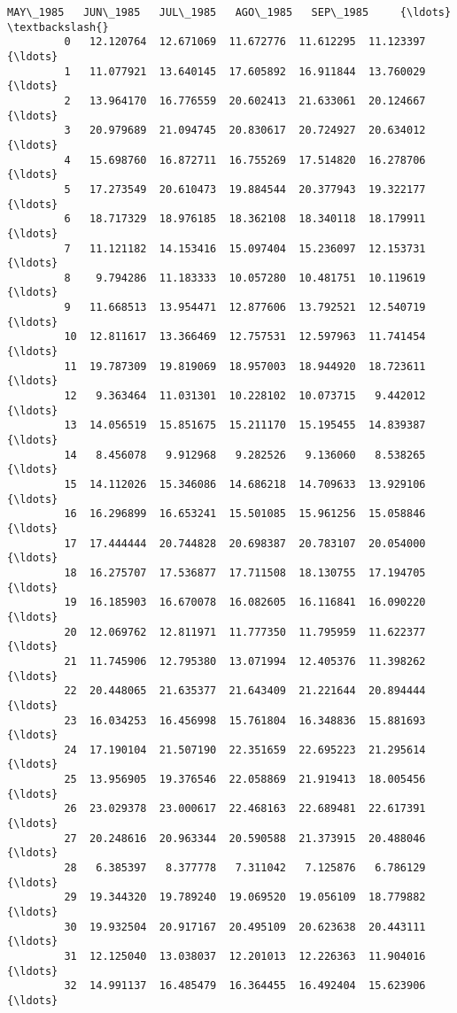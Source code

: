 \documentclass[11pt]{article}
\begin{document}
\begin{Verbatim}[commandchars=\\\{\}]
              MAY\_1985   JUN\_1985   JUL\_1985   AGO\_1985   SEP\_1985     {\ldots}      \textbackslash{}
         0   12.120764  12.671069  11.672776  11.612295  11.123397     {\ldots}       
         1   11.077921  13.640145  17.605892  16.911844  13.760029     {\ldots}       
         2   13.964170  16.776559  20.602413  21.633061  20.124667     {\ldots}       
         3   20.979689  21.094745  20.830617  20.724927  20.634012     {\ldots}       
         4   15.698760  16.872711  16.755269  17.514820  16.278706     {\ldots}       
         5   17.273549  20.610473  19.884544  20.377943  19.322177     {\ldots}       
         6   18.717329  18.976185  18.362108  18.340118  18.179911     {\ldots}       
         7   11.121182  14.153416  15.097404  15.236097  12.153731     {\ldots}       
         8    9.794286  11.183333  10.057280  10.481751  10.119619     {\ldots}       
         9   11.668513  13.954471  12.877606  13.792521  12.540719     {\ldots}       
         10  12.811617  13.366469  12.757531  12.597963  11.741454     {\ldots}       
         11  19.787309  19.819069  18.957003  18.944920  18.723611     {\ldots}       
         12   9.363464  11.031301  10.228102  10.073715   9.442012     {\ldots}       
         13  14.056519  15.851675  15.211170  15.195455  14.839387     {\ldots}       
         14   8.456078   9.912968   9.282526   9.136060   8.538265     {\ldots}       
         15  14.112026  15.346086  14.686218  14.709633  13.929106     {\ldots}       
         16  16.296899  16.653241  15.501085  15.961256  15.058846     {\ldots}       
         17  17.444444  20.744828  20.698387  20.783107  20.054000     {\ldots}       
         18  16.275707  17.536877  17.711508  18.130755  17.194705     {\ldots}       
         19  16.185903  16.670078  16.082605  16.116841  16.090220     {\ldots}       
         20  12.069762  12.811971  11.777350  11.795959  11.622377     {\ldots}       
         21  11.745906  12.795380  13.071994  12.405376  11.398262     {\ldots}       
         22  20.448065  21.635377  21.643409  21.221644  20.894444     {\ldots}       
         23  16.034253  16.456998  15.761804  16.348836  15.881693     {\ldots}       
         24  17.190104  21.507190  22.351659  22.695223  21.295614     {\ldots}       
         25  13.956905  19.376546  22.058869  21.919413  18.005456     {\ldots}       
         26  23.029378  23.000617  22.468163  22.689481  22.617391     {\ldots}       
         27  20.248616  20.963344  20.590588  21.373915  20.488046     {\ldots}       
         28   6.385397   8.377778   7.311042   7.125876   6.786129     {\ldots}       
         29  19.344320  19.789240  19.069520  19.056109  18.779882     {\ldots}       
         30  19.932504  20.917167  20.495109  20.623638  20.443111     {\ldots}       
         31  12.125040  13.038037  12.201013  12.226363  11.904016     {\ldots}       
         32  14.991137  16.485479  16.364455  16.492404  15.623906     {\ldots}       
         

\end{Verbatim}
\end{document}

